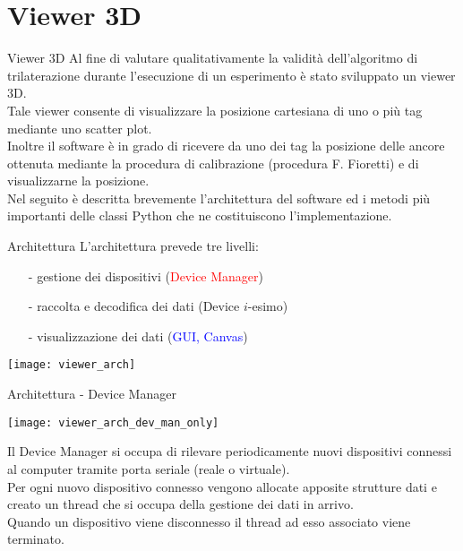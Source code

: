 \section{Viewer 3D}

\begin{frame}{Viewer 3D}
  Al fine di valutare \alert{qualitativamente} la validità dell'algoritmo di trilaterazione
  durante l'esecuzione di un esperimento è stato sviluppato un viewer 3D.\\
  Tale viewer consente di visualizzare la posizione cartesiana di uno o più tag
  mediante uno scatter plot.\\
  Inoltre il software è in grado di ricevere da uno dei tag la posizione delle ancore ottenuta
  mediante la procedura di calibrazione (procedura F. Fioretti) e di visualizzarne la posizione.\\
  Nel seguito è descritta brevemente l'architettura del software ed i metodi più importanti delle classi Python che ne
  costituiscono l'implementazione.
\end{frame}

\begin{frame}{Architettura}
  L'architettura prevede tre livelli:
  \begin{itemize}
  \item[-] gestione dei dispositivi (\textcolor{red}{Device Manager})
  \item[-] raccolta e decodifica dei dati (\textcolor{dgreen}{Device $i$-esimo})
  \item[-] visualizzazione dei dati (\textcolor{blue}{GUI, Canvas})
  \end{itemize}
  \texttt{[image: viewer\_arch]}
\end{frame}

\begin{frame}[shrink=10]{Architettura - Device Manager}
  \begin{center}
    \texttt{[image: viewer\_arch\_dev\_man\_only]}
  \end{center}
  Il Device Manager si occupa di rilevare periodicamente nuovi dispositivi connessi al computer tramite porta seriale
  (reale o virtuale).\\
  Per ogni nuovo dispositivo connesso vengono allocate apposite strutture dati e creato un thread che si occupa della gestione
  dei dati in arrivo.\\
  Quando un dispositivo viene disconnesso il thread ad esso associato viene terminato.
\end{frame}


